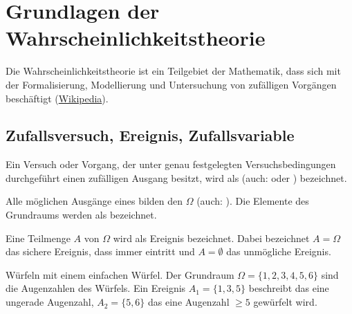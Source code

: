 \chapter{Grundlagen der Wahrscheinlichkeitstheorie}

Die Wahrscheinlichkeitstheorie ist ein Teilgebiet der Mathematik, dass sich mit
der Formalisierung, Modellierung und Untersuchung von zufälligen Vorgängen
beschäftigt (\href{https://de.wikipedia.org/wiki/Wahrscheinlichkeitstheorie}
{Wikipedia}).

\section{Zufallsversuch, Ereignis, Zufallsvariable}

\begin{definition}[Zufallsversuch]\label{def:zufallsversuch}
Ein Versuch oder Vorgang, der unter genau festgelegten Versuchsbedingungen
durchgeführt einen zufälligen Ausgang besitzt, wird als 
(auch:  oder )
bezeichnet.
\end{definition}


\begin{definition}[Grundraum]\label{def:grundraum}
Alle möglichen Ausgänge eines 
bilden den  $\Omega$ (auch: ). Die
Elemente des Grundraums werden als  bezeichnet.
\end{definition}


\begin{definition}[Ereignis]\label{def:ereignis}
Eine Teilmenge $A$ von $\Omega$ wird als Ereignis bezeichnet. Dabei bezeichnet
$A = \Omega$ das sichere Ereignis, dass immer eintritt und $A = \emptyset$ das
unmögliche Ereignis.
\end{definition}

\begin{example}\label{bsp:ereignis}
Würfeln mit einem einfachen Würfel. Der Grundraum $\Omega = \{1,2,3,4,5,6\}$
sind die Augenzahlen des Würfels. Ein Ereignis $A_1 = \{1,3,5\}$ beschreibt das
eine ungerade Augenzahl, $A_2 = \{5,6\}$ das
eine Augenzahl $\ge 5$ gewürfelt wird.
\end{example}


